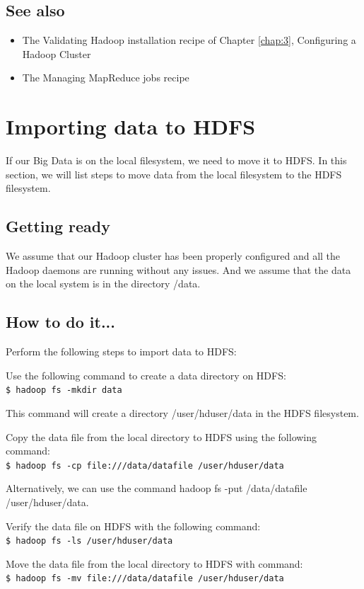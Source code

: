 \subsection*{See also}
\begin{itemize}
  \item The Validating Hadoop installation recipe of Chapter \ref{chap:3}, Configuring a Hadoop Cluster
  \item The Managing MapReduce jobs recipe
\end{itemize}


\section{Importing data to HDFS}
If our Big Data is on the local filesystem, we need to move it to HDFS. In this section, we will list steps to move data from the local filesystem to the HDFS filesystem.

\subsection*{Getting ready}
We assume that our Hadoop cluster has been properly configured and all the Hadoop daemons are running without any issues. And we assume that the data on the local system is in the directory /data.
\subsection*{How to do it...}
Perform the following steps to import data to HDFS: 

Use the following command to create a data directory on HDFS: \\
\verb|$ hadoop fs -mkdir data|

This command will create a directory /user/hduser/data in the HDFS filesystem.

Copy the data file from the local directory to HDFS using the following command: \\
\verb|$ hadoop fs -cp file:///data/datafile /user/hduser/data|

Alternatively, we can use the command hadoop fs -put /data/datafile /user/hduser/data.

Verify the data file on HDFS with the following command: \\
\verb|$ hadoop fs -ls /user/hduser/data|

Move the data file from the local directory to HDFS with command: \\
\verb|$ hadoop fs -mv file:///data/datafile /user/hduser/data|

